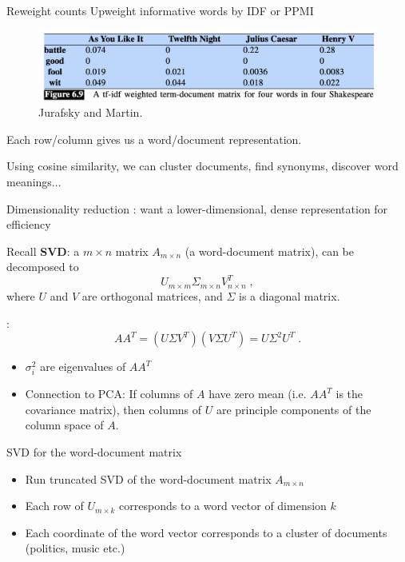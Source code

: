 \documentclass[usenames,dvipsnames,notes,11pt,aspectratio=169]{beamer}
\begin{document}
\begin{frame}
    {Reweight counts}
    Upweight informative words by IDF or PPMI
    \vspace{-1em}
    \begin{figure}
            \includegraphics[width=\textwidth]{figures/term-doc-tfidf}
                    \caption{Jurafsky and Martin.}
    \end{figure}

    Each row/column gives us a word/document representation.
    
    Using cosine similarity, we can cluster documents, find synonyms, discover word meanings...
\end{frame}

\begin{frame}
    {Dimensionality reduction}
    : want a lower-dimensional, dense representation for efficiency
    \pause

    Recall \textbf{SVD}: a $m\times n$ matrix $A_{m\times n}$ (\eg a word-document matrix),
    can be decomposed to
    $$
    U_{m\times m}\Sigma_{m\times n}V_{n\times n}^T \;,
    $$
    where $U$ and $V$ are orthogonal matrices, and $\Sigma$ is a diagonal matrix.
    \pause

    :
    $$
    AA^T = (U\Sigma V^T)(V\Sigma U^T) = U\Sigma^2 U^T \;.
    $$
    \vspace{-1em}
    \begin{itemize}
        \item $\sigma_i^2$ are eigenvalues of $AA^T$ 
        \item Connection to PCA: If columns of $A$ have zero mean (i.e. $AA^T$ is the covariance matrix), then columns of $U$ are principle components of the column space of $A$.
    \end{itemize}
\end{frame}

\begin{frame}
    {SVD for the word-document matrix}
    \gray{[board]}
    \begin{itemize}
        \item Run truncated SVD of the word-document matrix $A_{m\times n}$
        \item Each row of $U_{m\times k}$ corresponds to a word vector of dimension $k$
        \item Each coordinate of the word vector corresponds to a cluster of documents (\eg politics, music etc.)
    \end{itemize}
\end{frame}
\end{document}
